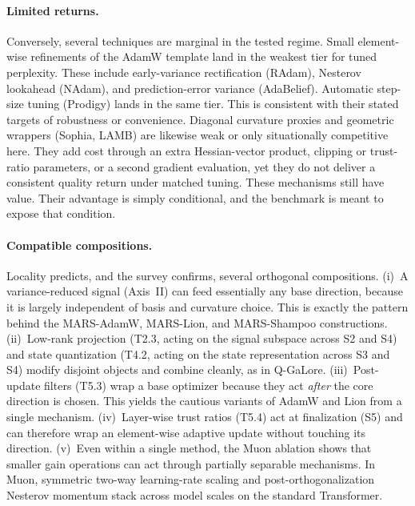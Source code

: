 \paragraph{Limited returns.}
Conversely, several techniques are marginal in the tested regime. Small
element-wise refinements of the AdamW template land in the weakest tier for
tuned perplexity. These include early-variance rectification (RAdam),
Nesterov lookahead (NAdam), and prediction-error variance (AdaBelief). Automatic
step-size tuning (Prodigy) lands in the same tier. This is consistent with
their stated targets of robustness or convenience.
Diagonal curvature proxies and geometric wrappers (Sophia, LAMB) are likewise
weak or only situationally competitive here. They add cost through an extra
Hessian-vector product, clipping or trust-ratio parameters, or a second gradient
evaluation, yet they do not deliver a consistent quality return under matched
tuning. These mechanisms still have value. Their advantage is simply
conditional, and the benchmark is meant to expose that condition.

\paragraph{Compatible compositions.}
Locality predicts, and the survey confirms, several orthogonal compositions.
(i)~A variance-reduced signal (Axis~II) can feed essentially any base direction,
because it is largely independent of basis and curvature choice. This is exactly
the pattern behind the MARS-AdamW, MARS-Lion, and MARS-Shampoo constructions.
(ii)~Low-rank projection (T2.3, acting on the signal subspace across S2 and
S4) and state quantization (T4.2, acting on the state representation across S3
and S4) modify disjoint objects and combine cleanly, as in Q-GaLore.
(iii)~Post-update filters (T5.3) wrap a base optimizer because they act
\emph{after} the core direction is chosen. This yields the cautious variants of
AdamW and Lion from a single mechanism. (iv)~Layer-wise trust ratios (T5.4)
act at finalization (S5) and can therefore wrap an element-wise adaptive update
without touching its direction. (v)~Even within a single method, the Muon
ablation shows that smaller gain operations can act through partially separable
mechanisms. In Muon, symmetric
two-way learning-rate scaling and post-orthogonalization Nesterov momentum stack
across model scales on the standard Transformer.

